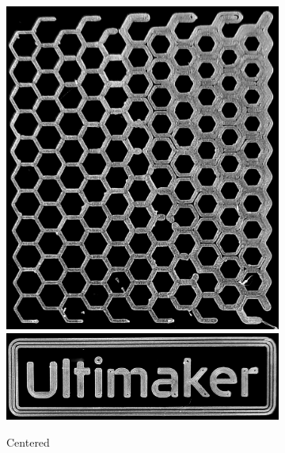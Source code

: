 \begin{figure}
\begin{subfigure}{\figwidth}
\includegraphics[height=\figheight]{sources/applications/P3_print_hex_center_edited.png}
\includegraphics[width=\figwidth]{sources/applications/P3_print_UM_center_edited.png}
\caption{Centered}\label{print_center}
\end{subfigure}
\begin{subfigure}{\figwidth}\centering

\end{subfigure}
\end{figure}
